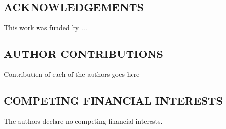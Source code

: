 

\section*{}
\subsection*{ACKNOWLEDGEMENTS}
This work was funded by ...

\subsection*{AUTHOR CONTRIBUTIONS} 
Contribution of each of the authors goes here

\subsection*{COMPETING FINANCIAL INTERESTS}
The authors declare no competing financial interests. 